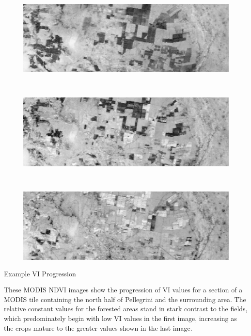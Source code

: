 \begin{ssfigure}
  \centering
  \begin{subfigure}[t]{\textwidth}
    \includegraphics[width=\textwidth]{Graphics/vi_band1.png}
    \caption*{}
    \label{subfig:vi_1}
  \end{subfigure}
  \\
  \vspace{0.125in}
  \begin{subfigure}[t]{\textwidth}
    \includegraphics[width=\textwidth]{Graphics/vi_band4.png}
    \caption*{}
    \label{subfig:vi_4}
  \end{subfigure}
  \\
  \vspace{.125in}
  \begin{subfigure}[b]{\textwidth}
    \includegraphics[width=\textwidth]{Graphics/vi_band8.png}
    \caption*{}
    \label{subfig:vi_8}
  \end{subfigure}
  \caption{Example VI Progression}
  \label{fig:tsi}
  \medskip
  \small
  These MODIS NDVI images show the progression of VI values for a section of a MODIS tile containing the north half of Pellegrini and the surrounding area. The relative constant values for the forested areas stand in stark contrast to the fields, which predominately begin with low VI values in the first image, increasing as the crops mature to the greater values shown in the last image.
\end{ssfigure}


